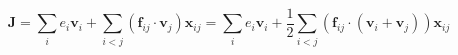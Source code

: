 \documentclass[12pt]{article}
\begin{document}
$$
\mathbf{J}  
= \sum_i e_i \mathbf{v}_i
+ \sum_{i<j} \left( \mathbf{f}_{ij} \cdot \mathbf{v}_j \right) \mathbf{x}_{ij}
= \sum_i e_i \mathbf{v}_i
+ \frac{1}{2} \sum_{i<j} \left( \mathbf{f}_{ij} \cdot \left(\mathbf{v}_i + \mathbf{v}_j \right)  \right) \mathbf{x}_{ij}
$$
\end{document}
